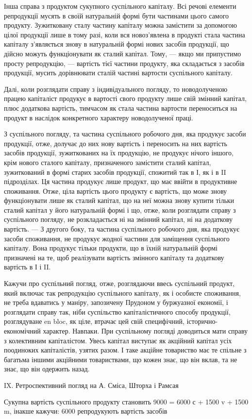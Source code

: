 Інша справа з продуктом сукупного суспільного капіталу. Всі речові
елементи репродукції мусять в своїй натуральній формі бути частинами
цього самого продукту. Зужитковану сталу частину капіталу можна замістити
за допомогою цілої продукції лише в тому разі, коли вся новоз’явлена
в продукті стала частина капіталу з’являється знову в натуральній
формі нових засобів продукції, що дійсно можуть функціонувати як сталий
капітал. Тому, — якщо ми припустимо просту репродукцію, — вартість
тієї частини продукту, яка складається з засобів продукції, мусить дорівнювати
сталій частині вартости суспільного капіталу.

Далі, коли розглядати справу з індивідуального погляду, то новодолученою
працею капіталіст продукує в вартості свого продукту лише свій змінний
капітал, плюс додаткова вартість, тимчасом як стала частина вартости
переноситься на продукт в наслідок конкретного характеру новодолученої
праці.

З суспільного погляду, та частина суспільного робочого дня, яка продукує
засоби продукції, отже, долучає до них нову вартість і переносить
на них вартість засобів продукції, зужиткованих на їх продукцію, не продукує
нічого іншого, крім нового сталого капіталу, призначеного
замістити сталий капітал, зужиткований в формі старих засобів продукції,
спожитий так в І, як і в II підрозділах. Ця частина продукує лише
продукт, що має ввійти в продуктивне споживання. Отже, ціла вартість
цього продукту є вартість, що може знову функціонувати лише як сталий
капітал, що на неї можна знову купити тільки сталий капітал у його
натуральній формі і що, отже, коли розглядати справу з суспільного погляду,
не розкладається ні на змінний капітал, ні на додаткову вартість.
— З другого боку, та частина суспільного робочого дня, яка продукує
засоби споживання, не продукує жодної частини для заміщення суспільного
капіталу. Вона продукує тільки продукти, що в їхній натуральній
формі призначені на те, щоб реалізувати вартість змінного капіталу
та додаткову вартість в І і II.

Кажучи про суспільний погляд, отже, розглядаючи ввесь суспільний
продукт, який включає так репродукцію суспільного капіталу, як і особисте
споживання, не треба вдаватись у маніру, запозичену Прудоном
у буржуазної економії, і розглядати справу так, ніби суспільство капіталістичного
способу продукції, розглядуване en bloc, як ціле, втрачає цей
свій специфічний, історично-економічний характер. Навпаки. При суспільному
погляді доводиться мати справу з колективним капіталістом. Увесь
капітал виступає як акційний капітал усіх поодиноких капіталістів, узятих
разом. І таке акційне товариство має те спільне з багатьма іншими
акційними товариствами, що кожен знає, що він вклав, та не знає, що
він одержить назад.

IX. Ретроспективний погляд на А. Сміса, Шторха і Рамсая

Сукупна вартість суспільного продукту становить 9000 = 6000 с +
1500 v + 1500 m, інакше кажучи: 6000 репродукують вартість засобів
